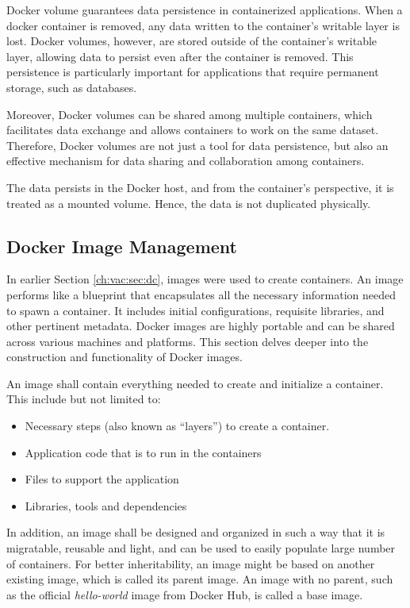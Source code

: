 Docker volume guarantees data persistence in containerized applications. When a docker container is removed, any data written to the container's writable layer is lost. Docker volumes, however, are stored outside of the container's writable layer, allowing data to persist even after the container is removed. This persistence is particularly important for applications that require permanent storage, such as databases.

Moreover, Docker volumes can be shared among multiple containers, which facilitates data exchange and allows containers to work on the same dataset. Therefore, Docker volumes are not just a tool for data persistence, but also an effective mechanism for data sharing and collaboration among containers.

The data persists in the Docker host, and from the container's perspective, it is treated as a mounted volume. Hence, the data is not duplicated physically.


\subsection{Docker Image Management} \label{ch:vac:sec:di}

In earlier Section \ref{ch:vac:sec:dc}, images were used to create containers. An image performs like a blueprint that encapsulates all the necessary information needed to spawn a container. It includes initial configurations, requisite libraries, and other pertinent metadata. Docker images are highly portable and can be shared across various machines and platforms. This section delves deeper into the construction and functionality of Docker images.

An image shall contain everything needed to create and initialize a container. This include but not limited to:
\begin{itemize}
  \item Necessary steps (also known as ``layers'') to create a container.
  \item Application code that is to run in the containers
  \item Files to support the application
  \item Libraries, tools and dependencies
\end{itemize}
In addition, an image shall be designed and organized in such a way that it is migratable, reusable and light, and can be used to easily populate large number of containers. For better inheritability, an image might be based on another existing image, which is called its parent image. An image with no parent, such as the official \textit{hello-world} image from Docker Hub, is called a base image.

